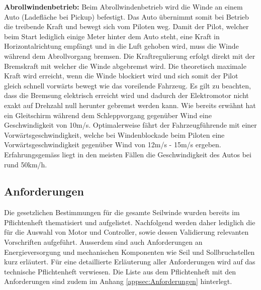 \textbf{Abrollwindenbetrieb:}
Beim Abrollwindenbetrieb wird die Winde an einem Auto (Ladefläche bei Pickup) befestigt. Das Auto übernimmt somit bei Betrieb die treibende Kraft und bewegt sich vom Piloten weg. Damit der Pilot, welcher beim Start lediglich einige Meter hinter dem Auto steht, eine Kraft in Horizontalrichtung empfängt und in die Luft gehoben wird, muss die Winde während dem Abrollvorgang bremsen. Die Kraftregulierung erfolgt direkt mit der Bremskraft mit welcher die Winde abgebremst wird. Die theoretisch maximale Kraft wird erreicht, wenn die Winde blockiert wird und sich somit der Pilot gleich schnell vorwärts bewegt wie das voreilende Fahrzeug. Es gilt zu beachten, dass die Bremsung elektrisch erreicht wird und dadurch der Elektromotor nicht exakt auf Drehzahl null herunter gebremst werden kann. Wie bereits erwähnt hat ein Gleitschirm während dem Schleppvorgang gegenüber Wind eine Geschwindigkeit von 10m/s. Optimalerweise fährt der Fahrzeugführende mit einer Vorwärtsgeschwindigkeit, welche bei Windenblockade beim Piloten eine Vorwärtsgeschwindigkeit gegenüber Wind von 12m/s - 15m/s ergeben. Erfahrungsgemäss liegt in den meisten Fällen die Geschwindigkeit des Autos bei rund 50km/h.


\subsection{Anforderungen}\label{subsec:Richtlinien}
Die gesetzlichen Bestimmungen für die gesamte Seilwinde wurden bereits im Pflichtenheft thematisiert und aufgelistet. Nachfolgend werden daher lediglich die für die Auswahl von Motor und Controller, sowie dessen Validierung relevanten Vorschriften aufgeführt. Ausserdem sind auch Anforderungen an Energieversorgung und mechanischen Komponenten wie Seil und Sollbruchstellen kurz erläutert. Für eine detaillierte Erläuterung aller Anforderungen wird auf das technische Pflichtenheft\cite{TechPflichtenheft} verwiesen. Die Liste aus dem Pflichtenheft mit den Anforderungen sind zudem im Anhang \ref{appsec:Anforderungen} hinterlegt.

